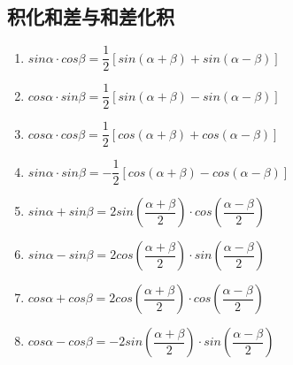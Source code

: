 \subsection*{积化和差与和差化积}
\begin{enumerate}
    \item $sin\alpha \cdot cos\beta = \dfrac{1}{2}[sin(\alpha+\beta) + sin(\alpha-\beta)]$
    \item $cos\alpha \cdot sin\beta = \dfrac{1}{2}[sin(\alpha+\beta) - sin(\alpha-\beta)]$
    \item $cos\alpha \cdot cos\beta = \dfrac{1}{2}[cos(\alpha+\beta) + cos(\alpha-\beta)]$
    \item $sin\alpha \cdot sin\beta = -\dfrac{1}{2}[cos(\alpha+\beta) - cos(\alpha-\beta)]$
    
    \item $sin\alpha + sin\beta = 2sin\left(\dfrac{\alpha+\beta}{2}\right) \cdot cos\left(\dfrac{\alpha-\beta}{2}\right)$
    \item $sin\alpha - sin\beta = 2cos\left(\dfrac{\alpha+\beta}{2}\right) \cdot sin\left(\dfrac{\alpha-\beta}{2}\right)$
    \item $cos\alpha + cos\beta = 2cos\left(\dfrac{\alpha+\beta}{2}\right) \cdot cos\left(\dfrac{\alpha-\beta}{2}\right)$
    \item $cos\alpha - cos\beta = -2sin\left(\dfrac{\alpha+\beta}{2}\right) \cdot sin\left(\dfrac{\alpha-\beta}{2}\right)$
\end{enumerate}

